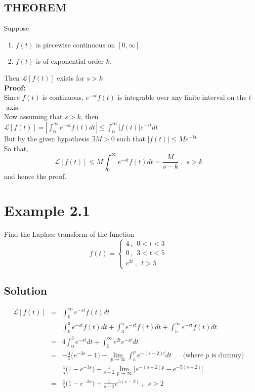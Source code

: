 \documentclass[11pt]{report}
\newcommand{\Laplace}{\mathcal{L}}
\newcommand{\ft}{f(t)}
\newcommand{\sbracket}[1]{\left[#1\right]}
\newcommand{\LFt}{\Laplace \sbracket{\ft}}
\newcommand{\sps}{\\[0.2cm]}
\newcommand{\bt}[1]{\textbf{#1}}
\newcommand{\dsp}{\displaystyle}
\begin{document}
	\subsection{THEOREM}
	\label{subsec:2_3_2}
	Suppose
	\begin{enumerate}
		\item $\ft$ is piecewise continuous on $[0,\infty]$
		\item $\ft$ is of exponential order $k$.
	\end{enumerate}
	Then $\LFt$ exists for $s > k$\sps
	\bt{Proof:}\\
	Since $\ft$ is continuous, $e^{-st}\ft$ is integrable over any finite interval on the $t$-axis.\\
	Now assuming that $s>k$, then\\
	$\dsp \LFt = \left| \int_0^\infty e^{-st}f(t)dt\right| \leq \int_0^\infty |\ft|e^{-st} dt$\\
	But by the given hypothesis $\exists M>0$ such that $|\ft| \leq Me^{-kt}$\\
	So that,\\
	$$
		\LFt \leq M\int_0^\infty e^{-st}f(t)dt = \dsp\frac{M}{s-k}~,~~ s > k
	$$
	and hence the proof.
	
	\section*{Example 2.1}
	Find the Laplace transform of the function\\
	\begin{equation*}
		f(t) = \left\{\begin{array}{l}
			4~,~~ 0 < t < 3\\
			0~, ~~ 3 < t < 5\\
			e^{2t}~, ~~ t > 5
		\end{array}\right.
	\end{equation*}

	\subsection*{Solution}
	\begin{eqnarray*}
		\LFt &=& \int_0^\infty e^{-st}\ft dt\\
		&=& \int_0^3 e^{-st}\ft dt + \int_3^5 e^{-st}\ft dt + \int_5^\infty e^{-st}\ft dt\\
		&=&4\int_0^3 e^{-st}dt + \int_5^\infty e^{2t}e^{-st}dt\\
		&=&-\frac{4}{5}\Big(e^{-3s} - 1\Big) - \lim\limits_{p\rightarrow\infty}\int_5^p e^{-(s-2)t}dt  ~~~~~~\text{ (where $p$ is dummy)}\\
		&=& \frac{4}{5}\Big(1-e^{-3s}\Big) - \frac{1}{s-2}\lim\limits_{p\rightarrow\infty}\Big[e^{-(s-2)p} - e^{-5(s-2)}\Big]\\
		&=&\frac{4}{5}\Big(1-e^{-3s}\Big)+ \frac{1}{s-2}e^{5(s-2)}~, ~~ s > 2
	\end{eqnarray*}
	
\end{document}

